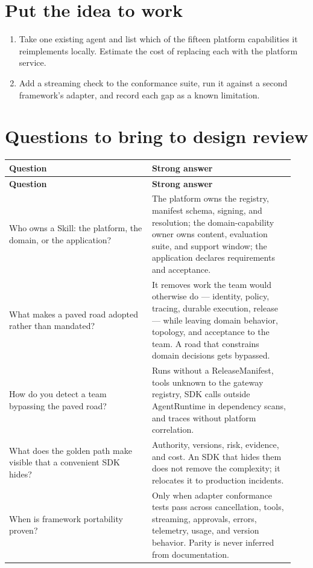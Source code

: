 \section{Put the idea to work}

\begin{enumerate}

\item Take one existing agent and list which of the fifteen platform capabilities it reimplements locally. Estimate the cost of replacing each with the platform service.

\item Add a streaming check to the conformance suite, run it against a second framework's adapter, and record each gap as a known limitation.

\end{enumerate}

\section{Questions to bring to design review}

\BookTableStart
\small
\begin{longtable}{@{}Y{0.4700\linewidth}Y{0.4700\linewidth}@{}}
\color{white}\bfseries \textbf{Question} & \color{white}\bfseries \textbf{Strong answer} \\
\endfirsthead
{}
\color{white}\bfseries \textbf{Question} & \color{white}\bfseries \textbf{Strong answer} \\
\endhead
Who owns a Skill: the platform, the domain, or the application? & The platform owns the registry, manifest schema, signing, and resolution; the domain-capability owner owns content, evaluation suite, and support window; the application declares requirements and acceptance. \\
What makes a paved road adopted rather than mandated? & It removes work the team would otherwise do — identity, policy, tracing, durable execution, release — while leaving domain behavior, topology, and acceptance to the team. A road that constrains domain decisions gets bypassed. \\
How do you detect a team bypassing the paved road? & Runs without a ReleaseManifest, tools unknown to the gateway registry, SDK calls outside AgentRuntime in dependency scans, and traces without platform correlation. \\
What does the golden path make visible that a convenient SDK hides? & Authority, versions, risk, evidence, and cost. An SDK that hides them does not remove the complexity; it relocates it to production incidents. \\
When is framework portability proven? & Only when adapter conformance tests pass across cancellation, tools, streaming, approvals, errors, telemetry, usage, and version behavior. Parity is never inferred from documentation. \\
\end{longtable}
\BookTableEnd

